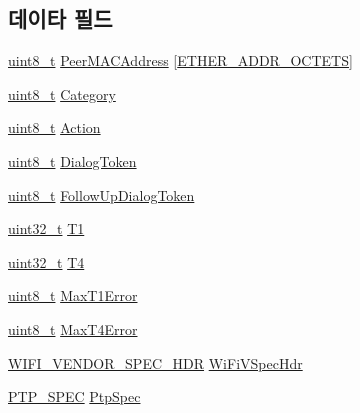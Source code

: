 \subsection*{데이타 필드}
\begin{DoxyCompactItemize}
\item 
\hyperlink{stdint_8h_aba7bc1797add20fe3efdf37ced1182c5}{uint8\+\_\+t} \hyperlink{struct___t_i_m_i_n_g_m_s_m_t___r_e_q_u_e_s_t_a08d9c385ed7bbc6dd95bd8dedb74d8c1}{Peer\+M\+A\+C\+Address} \mbox{[}\hyperlink{packet_8hpp_ab81d402a4929723091a6731508845125}{E\+T\+H\+E\+R\+\_\+\+A\+D\+D\+R\+\_\+\+O\+C\+T\+E\+TS}\mbox{]}
\item 
\hyperlink{stdint_8h_aba7bc1797add20fe3efdf37ced1182c5}{uint8\+\_\+t} \hyperlink{struct___t_i_m_i_n_g_m_s_m_t___r_e_q_u_e_s_t_a4d6c14dda7c936d83ad69f1cfb42f1f7}{Category}
\item 
\hyperlink{stdint_8h_aba7bc1797add20fe3efdf37ced1182c5}{uint8\+\_\+t} \hyperlink{struct___t_i_m_i_n_g_m_s_m_t___r_e_q_u_e_s_t_a6279ebdbcb11605a920804fd68c46b29}{Action}
\item 
\hyperlink{stdint_8h_aba7bc1797add20fe3efdf37ced1182c5}{uint8\+\_\+t} \hyperlink{struct___t_i_m_i_n_g_m_s_m_t___r_e_q_u_e_s_t_a27489d6ca946bf7052c24d316f2e76e9}{Dialog\+Token}
\item 
\hyperlink{stdint_8h_aba7bc1797add20fe3efdf37ced1182c5}{uint8\+\_\+t} \hyperlink{struct___t_i_m_i_n_g_m_s_m_t___r_e_q_u_e_s_t_a12f700635d1e47a953c199f6f7a54cab}{Follow\+Up\+Dialog\+Token}
\item 
\hyperlink{parse_8c_a6eb1e68cc391dd753bc8ce896dbb8315}{uint32\+\_\+t} \hyperlink{struct___t_i_m_i_n_g_m_s_m_t___r_e_q_u_e_s_t_a1965b8bc6a03c9475b77bf76010cc42f}{T1}
\item 
\hyperlink{parse_8c_a6eb1e68cc391dd753bc8ce896dbb8315}{uint32\+\_\+t} \hyperlink{struct___t_i_m_i_n_g_m_s_m_t___r_e_q_u_e_s_t_a4d070c49c8120152ba5cf1a5bc9c2b8b}{T4}
\item 
\hyperlink{stdint_8h_aba7bc1797add20fe3efdf37ced1182c5}{uint8\+\_\+t} \hyperlink{struct___t_i_m_i_n_g_m_s_m_t___r_e_q_u_e_s_t_a15be36379a054c172f725d3ca8cb67e0}{Max\+T1\+Error}
\item 
\hyperlink{stdint_8h_aba7bc1797add20fe3efdf37ced1182c5}{uint8\+\_\+t} \hyperlink{struct___t_i_m_i_n_g_m_s_m_t___r_e_q_u_e_s_t_a353f320544fda7ba4ceff75f3641ccae}{Max\+T4\+Error}
\item 
\hyperlink{wireless__tstamper_8hpp_a207322d3b5d879b7bf0efd076fed62b0}{W\+I\+F\+I\+\_\+\+V\+E\+N\+D\+O\+R\+\_\+\+S\+P\+E\+C\+\_\+\+H\+DR} \hyperlink{struct___t_i_m_i_n_g_m_s_m_t___r_e_q_u_e_s_t_a833245209a0ea1388cc5eda2f9aacf4d}{Wi\+Fi\+V\+Spec\+Hdr}
\item 
\hyperlink{wireless__tstamper_8hpp_a4f0884fe8f53e92876fa1ea5cc4c72ce}{P\+T\+P\+\_\+\+S\+P\+EC} \hyperlink{struct___t_i_m_i_n_g_m_s_m_t___r_e_q_u_e_s_t_aac5b14c9395b4892cd4b00b447726287}{Ptp\+Spec}
\end{DoxyCompactItemize}


